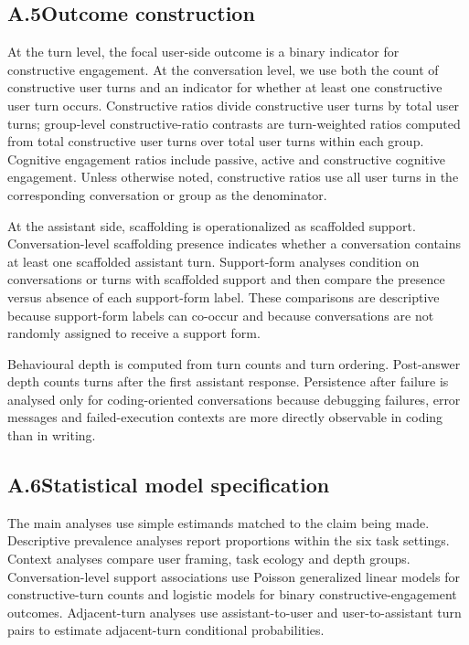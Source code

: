 \subsection*{A.5\quad Outcome construction}

At the turn level, the focal user-side outcome is a binary indicator for constructive engagement. At the conversation level, we use both the count of constructive user turns and an indicator for whether at least one constructive user turn occurs. Constructive ratios divide constructive user turns by total user turns; group-level constructive-ratio contrasts are turn-weighted ratios computed from total constructive user turns over total user turns within each group. Cognitive engagement ratios include passive, active and constructive cognitive engagement. Unless otherwise noted, constructive ratios use all user turns in the corresponding conversation or group as the denominator.

At the assistant side, scaffolding is operationalized as scaffolded support. Conversation-level scaffolding presence indicates whether a conversation contains at least one scaffolded assistant turn. Support-form analyses condition on conversations or turns with scaffolded support and then compare the presence versus absence of each support-form label. These comparisons are descriptive because support-form labels can co-occur and because conversations are not randomly assigned to receive a support form.

Behavioural depth is computed from turn counts and turn ordering. Post-answer depth counts turns after the first assistant response. Persistence after failure is analysed only for coding-oriented conversations because debugging failures, error messages and failed-execution contexts are more directly observable in coding than in writing.

\subsection*{A.6\quad Statistical model specification}

The main analyses use simple estimands matched to the claim being made. Descriptive prevalence analyses report proportions within the six task settings. Context analyses compare user framing, task ecology and depth groups. Conversation-level support associations use Poisson generalized linear models for constructive-turn counts and logistic models for binary constructive-engagement outcomes. Adjacent-turn analyses use assistant-to-user and user-to-assistant turn pairs to estimate adjacent-turn conditional probabilities.

